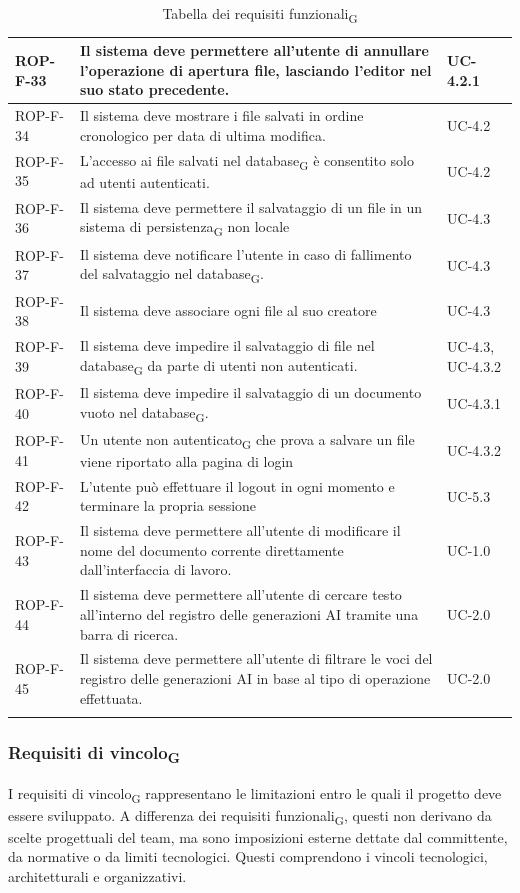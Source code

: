 \documentclass[11pt,a4paper]{article}
\newcommand{\gls}[1]{#1\textsubscript{G}}
\begin{document}
\begin{longtable}{|p{}|>{\raggedright\arraybackslash}p{}|p{}|}
\hline
ROP-F-33 & Il sistema deve permettere all'utente di annullare l'operazione di apertura file, lasciando l'editor nel suo stato precedente. & UC-4.2.1 \\
\hline
ROP-F-34 & Il sistema deve mostrare i file salvati in ordine cronologico per data di ultima modifica. & UC-4.2 \\
\hline
ROP-F-35 & L'accesso ai file salvati nel \gls{database} è consentito solo ad utenti autenticati. & UC-4.2 \\
\hline
ROP-F-36 & Il sistema deve permettere il salvataggio di un file in un \gls{sistema di persistenza} non locale & UC-4.3 \\
\hline
ROP-F-37 & Il sistema deve notificare l'utente in caso di fallimento del salvataggio nel \gls{database}. & UC-4.3 \\
\hline
ROP-F-38 & Il sistema deve associare ogni file al suo creatore & UC-4.3 \\
\hline
ROP-F-39 & Il sistema deve impedire il salvataggio di file nel \gls{database} da parte di utenti non autenticati. & UC-4.3, UC-4.3.2 \\
\hline
ROP-F-40 & Il sistema deve impedire il salvataggio di un documento vuoto nel \gls{database}. & UC-4.3.1 \\
\hline
ROP-F-41 & Un \gls{utente non autenticato} che prova a salvare un file viene riportato alla pagina di login & UC-4.3.2 \\
\hline
ROP-F-42 & L'utente può effettuare il logout in ogni momento e terminare la propria sessione & UC-5.3 \\
\hline
ROP-F-43 & Il sistema deve permettere all'utente di modificare il nome del documento corrente direttamente dall'interfaccia di lavoro. & UC-1.0 \\
\hline
ROP-F-44 & Il sistema deve permettere all'utente di cercare testo all'interno del registro delle generazioni AI tramite una barra di ricerca. & UC-2.0 \\
\hline
ROP-F-45 & Il sistema deve permettere all'utente di filtrare le voci del registro delle generazioni AI in base al tipo di operazione effettuata. & UC-2.0 \\
\hline
\addlinespace[1em]
\caption{Tabella dei \gls{requisiti funzionali}}
\end{longtable}

\newpage
\subsubsection{\gls{Requisiti di vincolo}}
I \gls{requisiti di vincolo} rappresentano le limitazioni entro le quali il progetto deve essere sviluppato. A differenza dei \gls{requisiti funzionali}, questi non derivano da scelte progettuali del team, ma sono imposizioni esterne dettate dal committente, da normative o da limiti tecnologici. Questi comprendono i vincoli tecnologici, architetturali e organizzativi.
\end{document}
